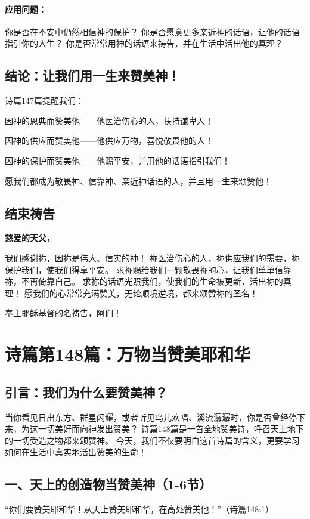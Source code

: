 \documentclass[a4paper, 12pt]{article}
\begin{document}
\paragraph*{应用问题：}
你是否在不安中仍然相信神的保护？
你是否愿意更多亲近神的话语，让他的话语指引你的人生？
你是否常常用神的话语来祷告，并在生活中活出他的真理？
\subsection*{结论：让我们用一生来赞美神！}
诗篇147篇提醒我们：

因神的恩典而赞美他——他医治伤心的人，扶持谦卑人！

因神的供应而赞美他——他供应万物，喜悦敬畏他的人！

因神的保护而赞美他——他赐平安，并用他的话语指引我们！

愿我们都成为敬畏神、信靠神、亲近神话语的人，并且用一生来颂赞他！

\subsection*{结束祷告}

\textbf{慈爱的天父，}

我们感谢祢，因祢是伟大、信实的神！
祢医治伤心的人，祢供应我们的需要，祢保护我们，使我们得享平安。
求祢赐给我们一颗敬畏祢的心，让我们单单信靠祢，不再倚靠自己。
求祢的话语光照我们，使我们的生命被更新，活出祢的真理！
愿我们的心常常充满赞美，无论顺境逆境，都来颂赞祢的圣名！

奉主耶稣基督的名祷告，阿们！
\newpage
\section{诗篇第148篇：万物当赞美耶和华}
\subsection*{引言：我们为什么要赞美神？}
当你看见日出东方、群星闪耀，或者听见鸟儿欢唱、溪流潺潺时，你是否曾经停下来，为这一切美好而向神发出赞美？ 诗篇148篇是一首全地赞美诗，呼召天上地下的一切受造之物都来颂赞神。
今天，我们不仅要明白这首诗篇的含义，更要学习如何在生活中真实地活出赞美的生命！

\subsection*{一、天上的创造物当赞美神（1-6节）}
“你们要赞美耶和华！从天上赞美耶和华，在高处赞美他！”（诗篇148:1）
\end{document}
